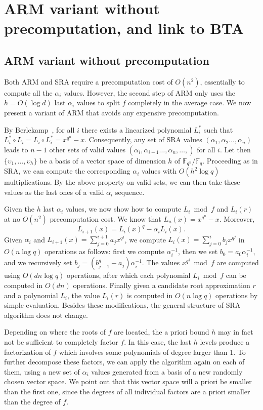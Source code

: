 \documentclass{sig-alternate}
\newcommand{\ff}[1]{\mathbb{F}_{#1}}
\newcommand{\fq}{\ff{q}}
\newcommand{\fqn}{\ff{q^n}}
\newcommand{\qq}{q}
\newcounter{algo}
\begin{document}
\section{ARM variant without precomputation, and link to BTA}


\subsection{ARM variant without precomputation\label{sec:BTA:ARMvariant}}

Both ARM and SRA require a precomputation cost of $O(n^2)$, essentially to compute all the $\alpha_i$ values. However, the second step of ARM only uses the $h=O(\log d)$ last $\alpha_i$ values  to split $f$ completely in the average case. We now present a variant of ARM that avoids any expensive precomputation.

By Berlekamp~\cite[Theorem..]{}, for all $i$ there exists a linearized polynomial $L_i^*$ such that $L_i^*\circ L_i=L_i\circ L_i^*=x^{q^n}-x$. Consequently, any set of SRA values $(\alpha_{1},\alpha_2\ldots,\alpha_{n})$ leads to $n-1$ other sets of valid values $(\alpha_{i},\alpha_{i+1}\ldots,\alpha_{n},\ldots,)$ for all $i$.
%
Let then $\{\upsilon_1,\ldots,\upsilon_h\}$ be a basis of a vector space of dimension $h$ of $\fqn/\fq$. Proceeding as in SRA, we can compute the corresponding $\alpha_i$ values with $O(h^2\log\qq)$ multiplications. By the above property on valid sets, we can then take these values as the last ones of a valid $\alpha_i$ sequence.

Given the $h$ last $\alpha_i$ values, we now show how to compute $L_i\bmod f$ and $L_i(r)$ at no $O(n^2)$ precomputation cost. We know that $L_n(x)=x^{q^n}-x$. Moreover,
$$L_{i+1}(x)=L_i(x)^q-\alpha_iL_i(x).$$
Given $\alpha_i$ and $L_{i+1}(x)=\sum_{j=0}^{i+1}a_jx^{q^j}$, we compute $L_i(x)=\sum_{j=0}^{i}b_jx^{q^j}$ in $O(n\log q)$ operations as follows: first we compute $\alpha_i^{-1}$, then we set $b_0=a_0\alpha_i^{-1}$, and we recursively set $b_j=(b_{j-1}^q-a_j)\alpha_i^{-1}$.
%
The values $x^{q^j}\bmod f$ are computed using $O(dn\log q)$ operations, after which each polynomial
$L_i\bmod f$ can be computed in $O(dn)$ operations.
%
Finally given a candidate root approximation $r$ and a polynomial $L_i$, the value $L_i(r)$ is computed in $O(n\log q)$ operations by simple evaluation. 
%
Besides these modifications, the general structure of SRA algorithm does not change.

Depending on where the roots of $f$ are located, the a priori bound $h$ may in fact not be sufficient to completely factor $f$. In this case, the last $h$ levels produce a factorization of $f$ which involves some polynomials of degree larger than 1. To further decompose these factors, we can apply the algorithm again on each of them, using a new set of $\alpha_i$ values generated from a basis of a new randomly chosen vector space. We point out that this vector space will a priori be smaller than the first one, since the degrees of all individual factors are a priori smaller than the degree of $f$.
\end{document}
